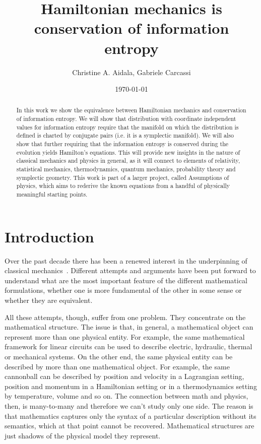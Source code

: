 \documentclass[11pt]{article}
\begin{document}
\title{Hamiltonian mechanics is conservation of information entropy}
\author{Christine A. Aidala, Gabriele Carcassi}



\date{\today}

\maketitle

\begin{abstract}
	In this work we show the equivalence between Hamiltonian mechanics and conservation of information entropy. We will show that distribution with coordinate independent values for information entropy require that the manifold on which the distribution is defined is charted by conjugate pairs (i.e. it is a symplectic manifold). We will also show that further requiring that the information entropy is conserved during the evolution yields Hamilton's equations. This will provide new insights in the nature of classical mechanics and physics in general, as it will connect to elements of relativity, statistical mechanics, thermodynamics, quantum mechanics, probability theory and symplectic geometry. This work is part of a larger project, called Assumptions of physics, which aims to rederive the known equations from a handful of physically meaningful starting points.
\end{abstract}

\tableofcontents
\newpage

\section{Introduction}

Over the past decade there has been a renewed interest in the underpinning of classical mechanics~\cite{North,Curiel,Barrett1,Barrett2}. Different attempts and arguments have been put forward to understand what are the most important feature of the different mathematical formulations, whether one is more fundamental of the other in some sense or whether they are equivalent.

All these attempts, though, suffer from one problem. They concentrate on the mathematical structure. The issue is that, in general, a mathematical object can represent more than one physical entity. For example, the same mathematical framework for linear circuits can be used to describe electric, hydraulic, thermal or mechanical systems. On the other end, the same physical entity can be described by more than one mathematical object. For example, the same cannonball can be described by position and velocity in a Lagrangian setting, position and momentum in a Hamiltonian setting or in a thermodynamics setting by temperature, volume and so on. The connection between math and physics, then, is many-to-many and therefore we can't study only one side. The reason is that mathematics captures only the syntax of a particular description without its semantics, which at that point cannot be recovered. Mathematical structures are just shadows of the physical model they represent.
\end{document}

